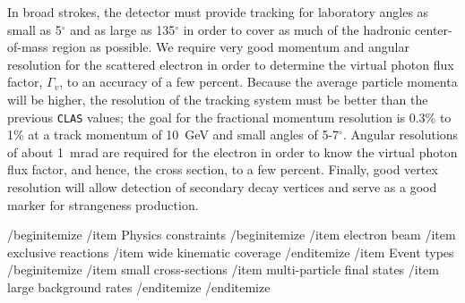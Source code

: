In broad strokes, the detector must provide tracking for laboratory angles as 
small as 5$^\circ$ and as large as 135$^\circ$ in order to cover as much of 
the hadronic center-of-mass region as possible.  We require very good momentum 
and angular resolution for the scattered electron in order to determine the 
virtual photon flux factor, $\Gamma_v$, to an accuracy of a few percent.
Because the average particle momenta will be higher, the resolution of the 
tracking system must be better than the previous {\tt CLAS} values; the goal 
for the fractional momentum resolution is 0.3\% to  1\% at a track momentum 
of 10~GeV and small angles of 5-7$^\circ$.  Angular resolutions of about 1~mrad are required for the electron 
in order to know the virtual photon flux factor, and hence, the cross section, 
to a few percent. Finally, good vertex resolution will allow detection of 
secondary decay vertices and serve as a good marker for strangeness production.

/begin{itemize}
/item Physics constraints
/begin{itemize}
/item electron beam
/item exclusive reactions
/item wide kinematic coverage
/end{itemize}
/item Event types
/begin{itemize}
/item small cross-sections
/item multi-particle final states
/item large background rates
/end{itemize}
/end{itemize}

















































